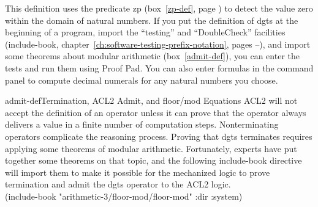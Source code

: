 This definition uses the predicate \textsf{zp}
(box~\ref{zp-def}, page \pageref{zp-def})
to detect the value zero within the domain of natural numbers.
If you put the definition of \textsf{dgts} at the beginning of a program,
import the ``testing'' and ``DoubleCheck'' facilities
(\textsf{include-book},
chapter~\ref{ch:software-testing-prefix-notation}, pages \pageref{testing-include}--\pageref{dblchk-include}),
and import some theorems about modular arithmetic
(box~\ref{admit-def}), %
you can enter the tests and run them using Proof Pad.
You can also enter formulas in the command panel to compute
decimal numerals for any natural numbers you choose.

\begin{aside}{admit-def}{Termination, ACL2 Admit, and \textsf{floor}/\textsf{mod} Equations}
ACL2 will not accept the definition of
an operator unless
it can prove that the operator always delivers a value in
a finite number of computation steps.
Nonterminating operators complicate the reasoning process.
Proving that \textsf{dgts} terminates
requires applying some theorems of modular arithmetic.
Fortunately, experts have put together some theorems on that topic,
and the following \textsf{include-book} directive will import them
to make it possible for the mechanized logic to prove termination
and admit the \textsf{dgts} operator to the ACL2 logic.\\
\hspace*{5mm}\textsf{(include-book "arithmetic-3/floor-mod/floor-mod" :dir :system)}\label{floor-mod-book}\label{floor-mod-include-book}
\end{aside}

